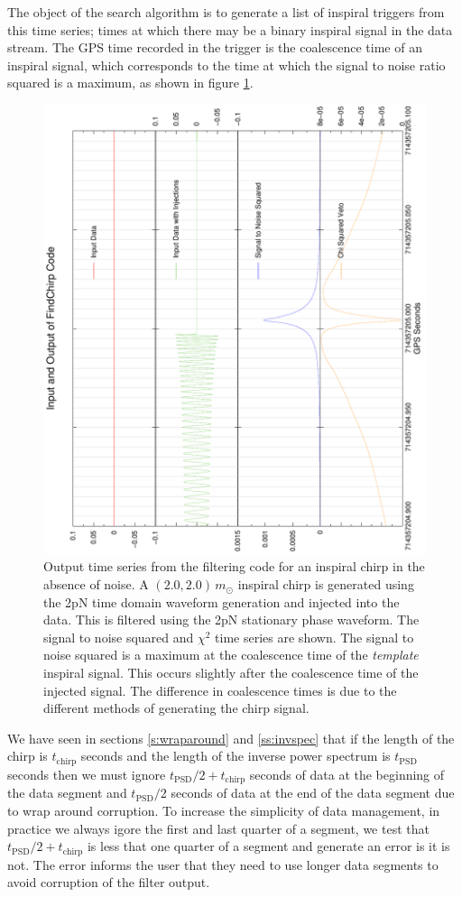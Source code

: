 The object of the search algorithm is to generate a list of inspiral triggers
from this time series; times at which there may be a binary inspiral signal in
the data stream. The GPS time recorded in the trigger is the coalescence time of
an inspiral signal, which corresponds to the time at which the signal to noise
ratio squared is a maximum, as shown in figure \ref{f:zero_inject_zoom}.
\begin{figure}[htb]
\begin{center}
\includegraphics[angle=-90,width=0.75\linewidth]{figures/findchirp/zero_inject_zoom}
\end{center}
\caption{\label{f:zero_inject_zoom}Output time series from the filtering code
for an inspiral chirp in the absence of noise. A $(2.0,2.0)\,m_\odot$ inspiral
chirp is generated using the 2pN time domain waveform generation and injected
into the data. This is filtered using the 2pN stationary phase waveform. The
signal to noise squared and $\chi^2$ time series are shown.  The signal to
noise squared is a maximum at the coalescence time of the \textit{template}
inspiral signal. This occurs slightly after the coalescence time of the
injected signal. The difference in coalescence times is due to the different
methods of generating the chirp signal.
}
\end{figure}

We have seen in sections \ref{s:wraparound} and \ref{ss:invspec} that if the
length of the chirp is $t_\mathrm{chirp}$ seconds and the length of the
inverse power spectrum is $t_\mathrm{PSD}$ seconds then we must ignore
$t_\mathrm{PSD}/2 + t_\mathrm{chirp}$ seconds of data at the beginning of the
data segment and $t_\mathrm{PSD}/2$ seconds of data at the end of the data
segment due to wrap around corruption. To increase the simplicity of data
management, in practice we always igore the first and last quarter of a
segment, we test that $t_\mathrm{PSD}/2 + t_\mathrm{chirp}$ is less that one
quarter of a segment and generate an error is it is not. The error informs the
user that they need to use longer data segments to avoid corruption of the
filter output.

